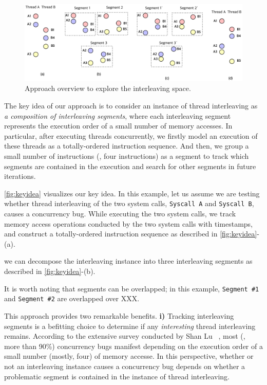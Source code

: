 \begin{figure}[t]
  \includegraphics[width=0.9\linewidth]{fig/intuition.pdf}
  \caption{Approach overview to explore the interleaving
    space.}
  \label{fig:keyidea}
\end{figure}
%
The key idea of our approach is to consider an instance of thread
interleaving as \textit{a composition of interleaving segments}, where
each interleaving segment represents the execution order of a small
number of memory accesses.
%
In particular, after executing threads concurrently, we firstly model
an execution of these threads as a totally-ordered instruction
sequence.
%
And then, we group a small number of instructions (\eg, four
instructions) as a segment to track which segments are contained in
the execution and search for other segments in future iterations.


\autoref{fig:keyidea} visualizes our key idea.
%
In this example, let us assume we are testing whether thread
interleaving of the two system calls, \texttt{Syscall A} and
\texttt{Syscall B}, causes a concurrency bug.
%
While executing the two system calls, we track memory access
operations conducted by the two system calls with timestamps, and
construct a totally-ordered instruction sequence as described in
\autoref{fig:keyidea}-(a).

we can decompose the interleaving instance into three interleaving
segments as described in \autoref{fig:keyidea}-(b).


It is worth noting that segments can be overlapped; in this example,
\texttt{Segment \#1} and \texttt{Segment \#2} are overlapped over XXX.





%
This approach provides two remarkable benefits.
%
\textbf{i)} Tracking interleaving segments is a befitting choice to
determine if any \textit{interesting} thread interleaving remains.
%
According to the extensive survey conducted by Shan Lu
\etal~\cite{learningfrommistakes}, most (\ie, more than 90\%)
concurrency bugs manifest depending on the execution order of a small
number (mostly, four) of memory accesse.
%
In this perspective, whether or not an interleaving instance causes a
concurrency bug depends on whether a problematic segment is contained
in the instance of thread interleaving.
%

